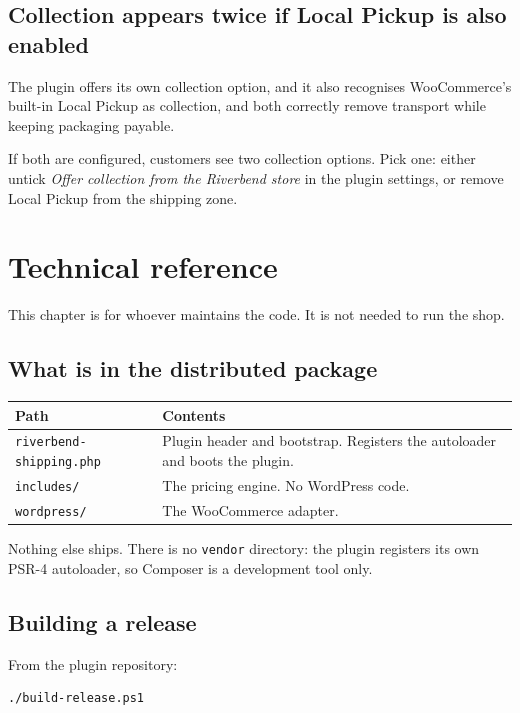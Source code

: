\documentclass[11pt,a4paper,oneside]{report}
\newcommand{\opt}[1]{\texttt{\small #1}}
\begin{document}
\section{Collection appears twice if Local Pickup is also enabled}
\label{sec:collection-clash}

The plugin offers its own collection option, and it also recognises WooCommerce's
built-in Local Pickup as collection, and both correctly remove transport while keeping
packaging payable.

If both are configured, customers see two collection options. Pick one: either untick
\emph{Offer collection from the Riverbend store} in the plugin settings, or remove
Local Pickup from the shipping zone.

\chapter{Technical reference}

This chapter is for whoever maintains the code. It is not needed to run the shop.

\section{What is in the distributed package}

\begin{longtable}{@{}L{4.6cm}L{10.2cm}@{}}
\toprule
\textbf{Path} & \textbf{Contents}\\
\midrule
\endhead
\opt{riverbend-shipping.php} & Plugin header and bootstrap. Registers the autoloader and boots the plugin.\\
\opt{includes/} & The pricing engine. No WordPress code.\\
\opt{wordpress/} & The WooCommerce adapter.\\
\bottomrule
\end{longtable}

Nothing else ships. There is no \opt{vendor} directory: the plugin registers its own
PSR-4 autoloader, so Composer is a development tool only.

\section{Building a release}

From the plugin repository:

\begin{lstlisting}[language=bash]
./build-release.ps1
\end{lstlisting}
\end{document}
